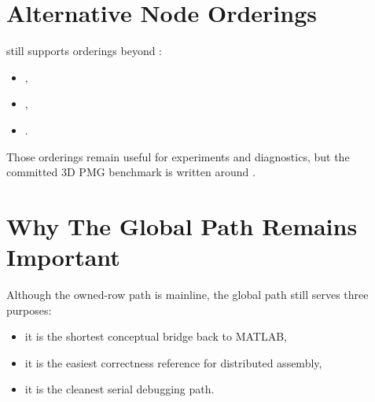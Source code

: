 \section{Alternative Node Orderings}

 still supports orderings beyond
:
\begin{itemize}
\item {},
\item {},
\item {}.
\end{itemize}

Those orderings remain useful for experiments and diagnostics, but the committed
3D PMG benchmark is written around .

\section{Why The Global Path Remains Important}

Although the owned-row path is mainline, the global path still serves three
purposes:
\begin{itemize}
\item it is the shortest conceptual bridge back to MATLAB,
\item it is the easiest correctness reference for distributed assembly,
\item it is the cleanest serial debugging path.
\end{itemize}
